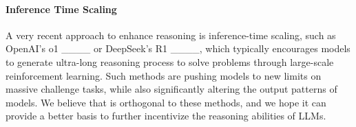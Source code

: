 \paragraph{Inference Time Scaling}
A very recent approach to enhance reasoning is inference-time scaling, such as OpenAI's o1 ____ or DeepSeek's R1 ____, which typically encourages models to generate ultra-long reasoning process to solve problems through large-scale reinforcement learning. Such methods are pushing models to new limits on massive challenge tasks, while also significantly altering the output patterns of models. We believe that \codeio{} is orthogonal to these methods, and we hope it can provide a better basis to further incentivize the reasoning abilities of LLMs.

